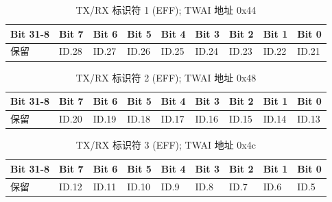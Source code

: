 \documentclass[main\_\_CN.tex]{subfiles}
\begin{document}
\begin{longtable}[c]{|p{1.4cm}|p{1.4cm}|p{1.4cm}|p{1.4cm}|p{1.4cm}|p{1.4cm}|p{1.4cm}|p{1.4cm}|p{1.4cm}|}
    \caption{TX/RX 标识符 1 (EFF); TWAI 地址 0x44}
    \label{tab:twai-tx-rx-identifier-1-eff}\\
    \hline
       \rowcolor{lightgray}
    \textbf{Bit 31-8} & \textbf{Bit 7} & \textbf{Bit 6} & \textbf{Bit 5} & \textbf{Bit 4} & \textbf{Bit 3} & \textbf{Bit 2} & \textbf{Bit 1} & \textbf{Bit 0}\\\hline
    保留 & ID.28 & ID.27 & ID.26 & ID.25 & ID.24 & ID.23 & ID.22 & ID.21\\
    \hline
\end{longtable}

\begin{longtable}[c]{|p{1.4cm}|p{1.4cm}|p{1.4cm}|p{1.4cm}|p{1.4cm}|p{1.4cm}|p{1.4cm}|p{1.4cm}|p{1.4cm}|}
    \caption{TX/RX 标识符 2 (EFF); TWAI 地址 0x48}
    \label{tab:twai-tx-rx-identifier-2-eff}\\
    \hline
       \rowcolor{lightgray}
    \textbf{Bit 31-8} & \textbf{Bit 7} & \textbf{Bit 6} & \textbf{Bit 5} & \textbf{Bit 4} & \textbf{Bit 3} & \textbf{Bit 2} & \textbf{Bit 1} & \textbf{Bit 0}\\\hline
    保留 & ID.20 & ID.19 & ID.18 & ID.17 & ID.16 & ID.15 & ID.14 & ID.13\\
    \hline
\end{longtable}

\begin{longtable}[c]{|p{1.4cm}|p{1.4cm}|p{1.4cm}|p{1.4cm}|p{1.4cm}|p{1.4cm}|p{1.4cm}|p{1.4cm}|p{1.4cm}|}
    \caption{TX/RX 标识符 3 (EFF); TWAI 地址 0x4c}
    \label{tab:twai-tx-rx-identifier-3-eff}\\
    \hline
       \rowcolor{lightgray}
    \textbf{Bit 31-8} & \textbf{Bit 7} & \textbf{Bit 6} & \textbf{Bit 5} & \textbf{Bit 4} & \textbf{Bit 3} & \textbf{Bit 2} & \textbf{Bit 1} & \textbf{Bit 0}\\\hline
    保留 & ID.12 & ID.11 & ID.10 & ID.9 & ID.8 & ID.7 & ID.6 & ID.5\\
    \hline
\end{longtable}
\end{document}
